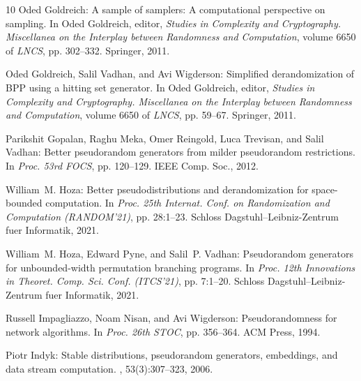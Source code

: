 \begin{thebibliography}{10}
{\sc Oded Goldreich}: A sample of samplers: {A} computational perspective on
  sampling.
\newblock In {\sc Oded Goldreich}, editor, {\em Studies in Complexity and
  Cryptography. Miscellanea on the Interplay between Randomness and
  Computation}, volume 6650 of {\em LNCS}, pp. 302--332. Springer, 2011.

{\sc Oded Goldreich, Salil Vadhan, and Avi Wigderson}: Simplified
  derandomization of {BPP} using a hitting set generator.
\newblock In {\sc Oded Goldreich}, editor, {\em Studies in Complexity and
  Cryptography. Miscellanea on the Interplay between Randomness and
  Computation}, volume 6650 of {\em LNCS}, pp. 59--67. Springer, 2011.
\newblock [\epfmtdoi{10.1007/978-3-642-22670-0\_8}]

{\sc Parikshit Gopalan, Raghu Meka, Omer Reingold, Luca Trevisan, and Salil
  Vadhan}: Better pseudorandom generators from milder pseudorandom
  restrictions.
\newblock In {\em Proc. 53rd FOCS}, pp. 120--129. IEEE Comp. Soc., 2012.

{\sc William~M. Hoza}: Better pseudodistributions and derandomization for
  space-bounded computation.
\newblock In {\em Proc. 25th Internat. Conf. on Randomization and Computation
  (RANDOM'21)}, pp. 28:1--23. Schloss Dagstuhl--Leibniz-Zentrum fuer
  Informatik, 2021.

{\sc William~M. Hoza, Edward Pyne, and Salil~P. Vadhan}: Pseudorandom
  generators for unbounded-width permutation branching programs.
\newblock In {\em Proc. 12th Innovations in Theoret. Comp. Sci. Conf.
  (ITCS'21)}, pp. 7:1--20. Schloss Dagstuhl--Leibniz-Zentrum fuer Informatik,
  2021.

{\sc Russell Impagliazzo, Noam Nisan, and Avi Wigderson}: Pseudorandomness for
  network algorithms.
\newblock In {\em Proc. 26th STOC}, pp. 356--364. ACM Press, 1994.
\newblock [\epfmtdoi{10.1145/195058.195190}]

{\sc Piotr Indyk}: Stable distributions, pseudorandom generators, embeddings,
  and data stream computation.
, 53(3):307--323, 2006.
\newblock [\epfmtdoi{10.1145/1147954.1147955}]


\end{thebibliography}
